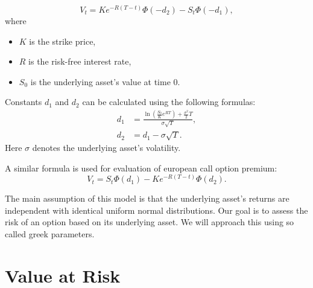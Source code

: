 \documentclass[a4paper, 12pt]{article}
\theoremstyle{definition}
\theoremstyle{plain}
\theoremstyle{definition}
\begin{document}
\begin{equation}\label{put}
    V_t = Ke^{-R(T-t)}\Phi(-d_2)-S_t\Phi(-d_1),
\end{equation}
where 
\begin{itemize}
    \item $K$ is the strike price,
    \item $R$ is the risk-free interest rate,
    \item $S_0$ is the underlying asset's value at time $0$.
\end{itemize}
Constants $d_1$ and $d_2$ can be calculated using the following formulas:
\begin{equation}
    \begin{aligned}
        d_1 &= \frac{\ln(\frac{S_0}{K}e^{RT})+\frac{\sigma^2}{2}T}{\sigma\sqrt{T}},\\
    d_2 &= d_1-\sigma\sqrt{T}. 
    \end{aligned}
\end{equation}
Here $\sigma$ denotes the underlying asset's volatility.

A similar formula is used for evaluation of european call option premium:
\begin{equation}\label{call}
    V_t = S_t\Phi(d_1) - Ke^{-R(T-t)}\Phi(d_2).
\end{equation}

The main assumption of this model is that the underlying asset's returns are 
independent with identical uniform normal distributions.
Our goal is to assess the risk of an option based on its underlying asset.
We will approach this using so called greek parameters.




\section{Value at Risk}
\end{document}
